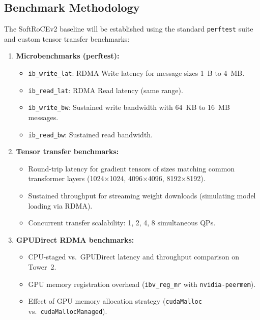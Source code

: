 \documentclass[11pt,letterpaper]{article}
\theoremstyle{definition}
\begin{document}
\subsection{Benchmark Methodology}

The SoftRoCEv2 baseline will be established using the standard \texttt{perftest} suite and custom tensor transfer benchmarks:

\begin{enumerate}
    \item \textbf{Microbenchmarks (perftest):}
    \begin{itemize}
        \item \texttt{ib\_write\_lat}: RDMA Write latency for message sizes 1~B to 4~MB.
        \item \texttt{ib\_read\_lat}: RDMA Read latency (same range).
        \item \texttt{ib\_write\_bw}: Sustained write bandwidth with 64~KB to 16~MB messages.
        \item \texttt{ib\_read\_bw}: Sustained read bandwidth.
    \end{itemize}

    \item \textbf{Tensor transfer benchmarks:}
    \begin{itemize}
        \item Round-trip latency for gradient tensors of sizes matching common transformer layers (1024$\times$1024, 4096$\times$4096, 8192$\times$8192).
        \item Sustained throughput for streaming weight downloads (simulating model loading via RDMA).
        \item Concurrent transfer scalability: 1, 2, 4, 8 simultaneous QPs.
    \end{itemize}

    \item \textbf{GPUDirect RDMA benchmarks:}
    \begin{itemize}
        \item CPU-staged vs.\ GPUDirect latency and throughput comparison on Tower~2.
        \item GPU memory registration overhead (\texttt{ibv\_reg\_mr} with \texttt{nvidia-peermem}).
        \item Effect of GPU memory allocation strategy (\texttt{cudaMalloc} vs.\ \texttt{cudaMallocManaged}).
    \end{itemize}
\end{enumerate}
\end{document}
